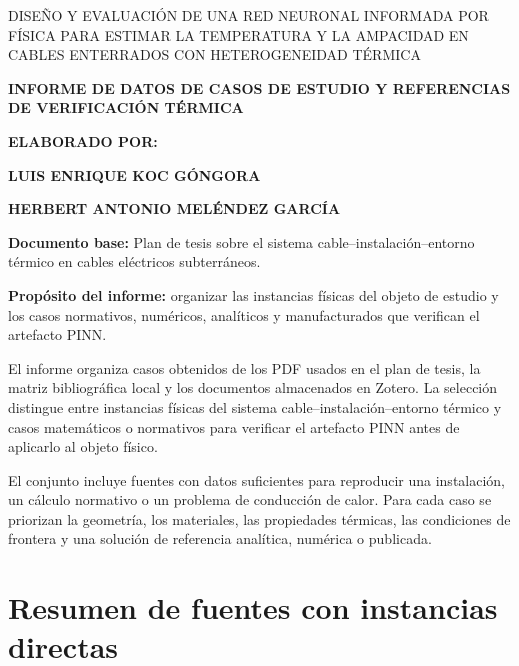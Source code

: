 \documentclass[11pt,a4paper,oneside]{report}
\newcommand{\tesisbodyfont}{\fontsize{11}{13.6}\selectfont}
\newcommand{\tituloTesis}{Diseño y evaluación de una red neuronal informada por física para estimar la temperatura y la ampacidad en cables enterrados con heterogeneidad térmica}
\newcommand{\tituloInforme}{Informe de datos de casos de estudio y referencias de verificación térmica}
\begin{document}
\tesisbodyfont
{}

\begin{center}
{\fontsize{9}{10.8}\selectfont\MakeUppercase{\tituloTesis}\par}
\vspace{0.35cm}
{\fontsize{14}{16.8}\selectfont\bfseries\MakeUppercase{\tituloInforme}\par}
\vspace{0.35cm}
{\fontsize{11}{13.2}\selectfont\bfseries ELABORADO POR:\par}
\vspace{0.12cm}
{\fontsize{11}{13.2}\selectfont\bfseries LUIS ENRIQUE KOC GÓNGORA\par}
{\fontsize{11}{13.2}\selectfont\bfseries HERBERT ANTONIO MELÉNDEZ GARCÍA\par}
\end{center}

\vspace{0.45cm}
\noindent\textbf{Documento base:} Plan de tesis sobre el sistema cable--instalación--entorno térmico en cables eléctricos subterráneos.

\noindent\textbf{Propósito del informe:} organizar las instancias físicas del objeto de estudio y los casos normativos, numéricos, analíticos y manufacturados que verifican el artefacto PINN.


El informe organiza casos obtenidos de los PDF usados en el plan de
tesis, la matriz bibliográfica local y los documentos almacenados en
Zotero. La selección distingue entre instancias físicas del sistema
cable--instalación--entorno térmico y casos matemáticos o normativos
para verificar el artefacto PINN antes de aplicarlo al objeto físico.

El conjunto incluye fuentes con datos suficientes para reproducir una
instalación, un cálculo normativo o un problema de conducción de calor.
Para cada caso se priorizan la geometría, los materiales, las
propiedades térmicas, las condiciones de frontera y una solución de
referencia analítica, numérica o publicada.

\section{Resumen de fuentes con instancias
directas}\label{resumen-de-fuentes-con-instancias-directas}
\end{document}
